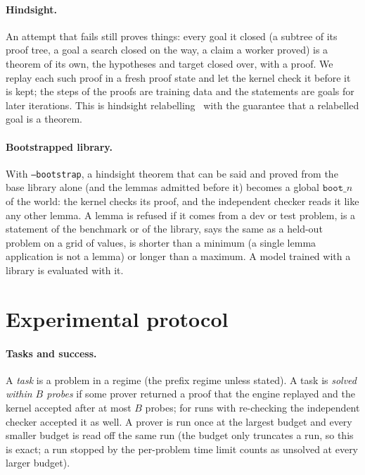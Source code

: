 \documentclass[10pt]{article}
\newcommand{\code}[1]{\texttt{#1}}
\begin{document}
\paragraph{Hindsight.}
An attempt that fails still proves things: every goal it closed (a subtree of its proof tree, a goal a search closed on the way, a claim a worker proved) is a theorem of its own, the hypotheses and target closed over, with a proof. We replay each such proof in a fresh proof state and let the kernel check it before it is kept; the steps of the proofs are training data and the statements are goals for later iterations. This is hindsight relabelling~\citep{andrychowicz2017hindsight,poesia2024learning} with the guarantee that a relabelled goal is a theorem.

\paragraph{Bootstrapped library.}
With \code{--bootstrap}, a hindsight theorem that can be said and proved from the base library alone (and the lemmas admitted before it) becomes a global $\code{boot\_}n$ of the world: the kernel checks its proof, and the independent checker reads it like any other lemma. A lemma is refused if it comes from a dev or test problem, is a statement of the benchmark or of the library, says the same as a held-out problem on a grid of values, is shorter than a minimum (a single lemma application is not a lemma) or longer than a maximum. A model trained with a library is evaluated with it.

\section{Experimental protocol}\label{sec:protocol}

\paragraph{Tasks and success.}
A \emph{task} is a problem in a regime (the prefix regime unless stated). A task is \emph{solved within $B$ probes} if some prover returned a proof that the engine replayed and the kernel accepted after at most $B$ probes; for runs with re-checking the independent checker accepted it as well. A prover is run once at the largest budget and every smaller budget is read off the same run (the budget only truncates a run, so this is exact; a run stopped by the per-problem time limit counts as unsolved at every larger budget).
\end{document}
